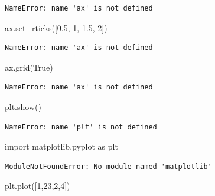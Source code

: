 \documentclass[
  spanish,
  12pt,
  letterpaper,
  DIV=11,
  numbers=noendperiod]{scrreprt}
\newenvironment{Shaded}{\begin{snugshade}}{\end{snugshade}}
\newcommand{\DecValTok}[1]{\textcolor[rgb]{0.68,0.00,0.00}{#1}}
\newcommand{\FloatTok}[1]{\textcolor[rgb]{0.68,0.00,0.00}{#1}}
\newcommand{\ImportTok}[1]{\textcolor[rgb]{0.00,0.46,0.62}{#1}}
\newcommand{\NormalTok}[1]{\textcolor[rgb]{0.00,0.23,0.31}{#1}}
\newcommand{\VariableTok}[1]{\textcolor[rgb]{0.07,0.07,0.07}{#1}}
\begin{document}
\begin{verbatim}
NameError: name 'ax' is not defined
\end{verbatim}

\begin{Shaded}
\begin{Highlighting}[]
\NormalTok{ax.set\_rticks([}\FloatTok{0.5}\NormalTok{, }\DecValTok{1}\NormalTok{, }\FloatTok{1.5}\NormalTok{, }\DecValTok{2}\NormalTok{])}
\end{Highlighting}
\end{Shaded}

\begin{verbatim}
NameError: name 'ax' is not defined
\end{verbatim}

\begin{Shaded}
\begin{Highlighting}[]
\NormalTok{ax.grid(}\VariableTok{True}\NormalTok{)}
\end{Highlighting}
\end{Shaded}

\begin{verbatim}
NameError: name 'ax' is not defined
\end{verbatim}

\begin{Shaded}
\begin{Highlighting}[]
\NormalTok{plt.show()}
\end{Highlighting}
\end{Shaded}

\begin{verbatim}
NameError: name 'plt' is not defined
\end{verbatim}

\begin{Shaded}
\begin{Highlighting}[]
\ImportTok{import}\NormalTok{ matplotlib.pyplot }\ImportTok{as}\NormalTok{ plt}
\end{Highlighting}
\end{Shaded}

\begin{verbatim}
ModuleNotFoundError: No module named 'matplotlib'
\end{verbatim}

\begin{Shaded}
\begin{Highlighting}[]
\NormalTok{plt.plot([}\DecValTok{1}\NormalTok{,}\DecValTok{23}\NormalTok{,}\DecValTok{2}\NormalTok{,}\DecValTok{4}\NormalTok{])}
\end{Highlighting}
\end{Shaded}
\end{document}
